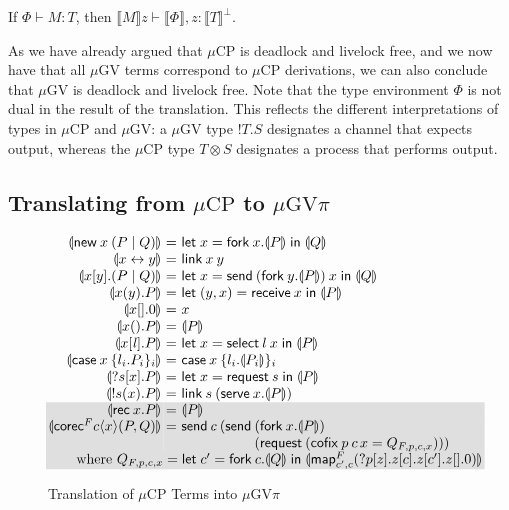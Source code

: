\documentclass[orivec,envcountsame]{llncs}
\makeatletter
\newcommand{\cpdual}[1]{#1^\perp}
\newcommand{\gvout}[2]{{!#1.#2}}
\newcommand{\cptyp}[2]{#1 \vdash #2}
\newcommand{\gvtyp}[3]{#1 \vdash #2 : #3}
\newcommand{\mapname}{\mathsf{map}}
\newcommand{\map}[3]{\mapname^{#1}_{#2}(#3)}
\newcommand{\mkwd}[1]{\mathsf{#1}}
\newcommand{\link}[2]{#1 \leftrightarrow #2}
\newcommand{\cut}[4]{\mkwd{new}\:#1 \: (#3 \mid #4)}
\newcommand{\replicate}[2]{{!#1(#2)}}
\newcommand{\derelict}[2]{{?#1[#2]}}
\newcommand{\rec}[1]{\mkwd{rec}\:#1}
\newcommand{\corecf}[5]{\mkwd{corec}^{#1} #2 \langle #3 \rangle (#4,#5)}
\newcommand{\clabel}[1]{\mathit{#1}}
\renewcommand{\case}[2]{\mkwd{case}\:#1\:\{#2\}}
\newcommand{\sel}[2]{#1[\clabel{#2}]}
\newcommand{\gvsend}[2]{\mkwd{send}\:#1\:#2}
\newcommand{\gvreceive}[1]{\mkwd{receive}\:#1}
\newcommand{\gvlet}[3]{\mkwd{let}\;#1 = #2\;\mkwd{in}\;#3}
\newcommand{\gvselect}[2]{\mkwd{select}\:#1\:#2}
\newcommand{\gvcase}[2]{\mkwd{case}\:#1\:\{#2\}}
\newcommand{\gvlink}[2]{\mkwd{link}\:#1\:#2}
\newcommand{\gvfork}[2]{\mkwd{fork}\:#1.#2}
\newcommand{\lrkwd}{\mkwd{cofix}}
\newcommand{\gvfix}[3]{\lrkwd\:#1\:#2 = #3}
\newcommand{\gvserve}[2]{\mkwd{serve}\:#1.#2}
\newcommand{\gvrequest}[1]{\mkwd{request}\:#1}
\newcommand{\key}{\mkwd}
\newcommand{\tocp}[1]{\llbracket #1 \rrbracket}
\newcommand{\togv}[1]{\llparenthesis #1 \rrparenthesis}
\newcommand{\mucp}{$\mu\mathrm{CP}$\xspace}
\newcommand{\mugv}{$\mu\mathrm{GV}$\xspace}
\newcommand{\gvpi}{$\mu\mathrm{GV}\pi$\xspace}
\newcommand{\ba}{\begin{array}}
\newcommand{\ea}{\end{array}}
\newcommand{\bl}{\ba[t]{@{}l@{}}}
\newcommand{\el}{\ea}
\newenvironment{equations}{\[\ba{@{}r@{~}c@{~}l@{}}}{\ea\]}
\newcommand\shaderow{\noalign{\vskip-0.4pt}\rowcolor{shade}[0.6mm]}
\makeatother
\begin{document}
\begin{theorem}
  If $\gvtyp{\Phi}{M}{T}$, then $\cptyp{\tocp{M}z}{\tocp{\Phi},z:\cpdual{\tocp{T}}}$.
\end{theorem}
As we have already argued that \mucp is deadlock and livelock free, and we now have that all \mugv
terms correspond to \mucp derivations, we can also conclude that \mugv is deadlock and livelock
free.  Note that the type environment $\Phi$ is not dual in the result of the translation.  This
reflects the different interpretations of types in \mucp and \mugv: a \mugv type $\gvout{T}{S}$
designates a channel that expects output, whereas the \mucp type $T \otimes S$ designates a process
that performs output.

\subsection{Translating from \mucp to \gvpi}\label{sec:cptogvpi}

\begin{figure}[float]
\small
\begin{equations}
  \togv{\cut{x}{}{P}{Q}} &=&
    \gvlet{x}{\gvfork{x}{\togv{P}}}{\togv{Q}} \\
  \togv{\link{x}{y}} &=& \gvlink{x}{y} \\
  \togv{x[y].(P \mid Q)} &=&
    \gvlet{x}{\gvsend{(\gvfork{y}{\togv{P}})}{x}}{\togv{Q}} \\
  \togv{x(y).P} &=&
    \gvlet{(y,x)}{\gvreceive{x}}{\togv{P}} \\
  \togv{x[].0} &=& x \\
  \togv{x().P} &=& \togv{P} \\
  \togv{\sel{x}{\mathit{l}}.P} &=&
    \gvlet{x}{\gvselect{l}{x}}{\togv{P}} \\
  \togv{\case{x}{l_i.P_i}_i} &=&
    \gvcase{x}{l_i.\togv{P_i}}_i \\
  \togv{\derelict{s}{x}.P} &=&
    \gvlet{x}{\gvrequest{s}}{\togv{P}} \\
  \togv{\replicate{s}{x}.P} &=&
    \gvlink{s}{(\gvserve{x}{\togv{P}})} \\  \shaderow
  \togv{\rec{x}.P} &=& \togv{P} \\ \shaderow
  \togv{\corecf{F}{c}{x}{P}{Q}} &=&
    \key{send}\:c\:(
      \key{send}\:
         \bl
         (\gvfork{x}{\togv{P}}) \\
         (\gvrequest{(\gvfix{p}{c\,x}{Q_{F,p,c,x}})})) \\
         \el \\ \shaderow
\multicolumn{3}{@{}l@{}}
{\qquad\text{where }
  Q_{F,p,c,x} =
    \gvlet{c'}{\gvfork{c}{\togv{Q}}}
          {\togv{\map{F}{c',c}{\derelict{p}{z}.z[c].z[c'].z[].0}}}}
\end{equations}%
\caption{Translation of \mucp Terms into \gvpi}\label{fig:fromcp}
\end{figure}
\end{document}
